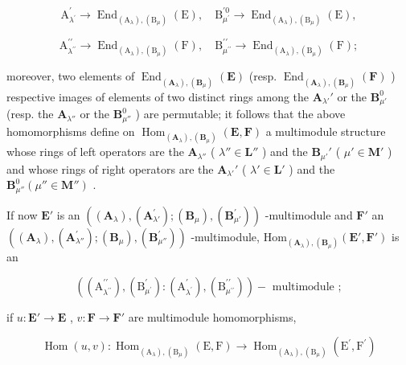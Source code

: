 \[
\mathrm{A} _ {\lambda^ {\prime}} ^ {\prime} \rightarrow \operatorname{End} _ {(\mathrm{A} _ {\lambda}), (\mathrm{B} _ {\mu})} (\mathrm{E}), \quad \mathrm{B} _ {\mu^ {\prime}} ^ {\prime 0} \rightarrow \operatorname{End} _ {(\mathrm{A} _ {\lambda}), (\mathrm{B} _ {\mu})} (\mathrm{E}),
\]

\[
\mathrm{A} _ {\lambda^ {\prime \prime}} ^ {\prime \prime} \rightarrow \operatorname{End} _ {(\mathrm{A} _ {\lambda}), (\mathrm{B} _ {\mu})} (\mathrm{F}), \quad \mathrm{B} _ {\mu^ {\prime \prime}} ^ {\prime \prime} \rightarrow \operatorname{End} _ {(\mathrm{A} _ {\lambda}), (\mathrm{B} _ {\mu})} (\mathrm{F});
\]

moreover, two elements of \(\operatorname{End}_{(\mathbf{A}_{\lambda}), (\mathbf{B}_{\mu})}(\mathbf{E})\) (resp. \(\operatorname{End}_{(\mathbf{A}_{\lambda}), (\mathbf{B}_{\mu})}(\mathbf{F})\) ) respective images of elements of two distinct rings among the \(\mathbf{A}_{\lambda'}'\) or the \(\mathbf{B}_{\mu'}^{0}\) (resp. the \(\mathbf{A}_{\lambda''}\) or the \(\mathbf{B}_{\mu''}^{0}\) ) are permutable; it follows that the above homomorphisms define on \(\operatorname{Hom}_{(\mathbf{A}_{\lambda}), (\mathbf{B}_{\mu})}(\mathbf{E}, \mathbf{F})\) a multimodule structure whose rings of left operators are the \(\mathbf{A}_{\lambda''}\) ( \(\lambda'' \in \mathbf{L}''\) ) and the \(\mathbf{B}_{\mu'}'\) ( \(\mu' \in \mathbf{M}'\) ) and whose rings of right operators are the \(\mathbf{A}_{\lambda'}'\) ( \(\lambda' \in \mathbf{L}'\) ) and the \(\mathbf{B}_{\mu''}^{0}(\mu'' \in \mathbf{M}'')\) .

If now \(\mathbf{E}'\) is an \(((\mathbf{A}_{\lambda}), (\mathbf{A}_{\lambda'}^{\prime}) ; (\mathbf{B}_{\mu}), (\mathbf{B}_{\mu'}^{\prime}))\) -multimodule and \(\mathbf{F}'\) an \(((\mathbf{A}_{\lambda}), (\mathbf{A}_{\lambda''}^{\prime}) ; (\mathbf{B}_{\mu}), (\mathbf{B}_{\mu''}^{\prime}))\) -multimodule, \(\mathrm{Hom}_{(\mathbf{A}_{\lambda}), (\mathbf{B}_{\mu})}(\mathbf{E}', \mathbf{F}')\) is an

\[
\left(\left(\mathrm{A} _ {\lambda^ {\prime \prime}} ^ {\prime \prime}\right), \left(\mathrm{B} _ {\mu^ {\prime}} ^ {\prime}\right): \left(\mathrm{A} _ {\lambda^ {\prime}} ^ {\prime}\right), \left(\mathrm{B} _ {\mu^ {\prime \prime}} ^ {\prime \prime}\right)\right) - \text { multimodule };
\]

if \(u: \mathbf{E}' \to \mathbf{E}\) , \(v: \mathbf{F} \to \mathbf{F}'\) are multimodule homomorphisms,

\[
\operatorname{Hom} (u, v): \operatorname{Hom} _ {\left(\mathrm{A} _ {\lambda}\right), \left(\mathrm{B} _ {\mu}\right)} (\mathrm{E}, \mathrm{F}) \rightarrow \operatorname{Hom} _ {\left(\mathrm{A} _ {\lambda}\right), \left(\mathrm{B} _ {\mu}\right)} \left(\mathrm{E} ^ {\prime}, \mathrm{F} ^ {\prime}\right)
\]

